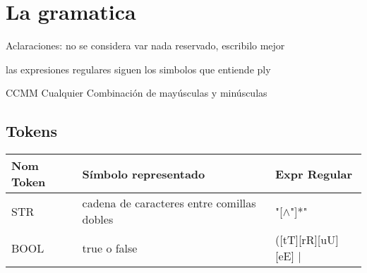 \section{La gramatica}

Aclaraciones: no se considera var nada reservado, escribilo mejor

las expresiones regulares siguen los simbolos que entiende ply

CCMM Cualquier Combinación de mayúsculas y minúsculas

\subsection{Tokens}

\begin{table}[!htb]
\begin{center}
\begin{tabular}{| l | l | l |}
\hline
Nom Token & Símbolo representado & Expr Regular\\
\hline
STR 	& cadena de caracteres entre comillas dobles & "[$\wedge$"]*" \\
\hline
BOOL & true o false & ([tT][rR][uU][eE] $\mid$ \\


\end{tabular}
\end{center}
\end{table}
